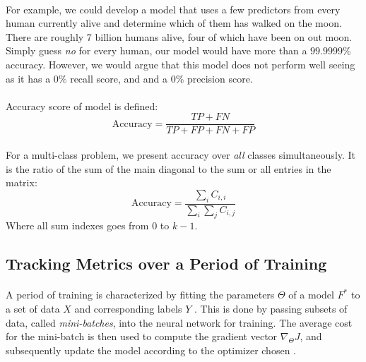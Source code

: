 \documentclass[12pt,letterpaper]{article}
\begin{document}
\paragraph*{}For example, we could develop a model that uses a few predictors from every human currently alive and determine which of them has walked on the moon. There are roughly 7 billion humans alive, four of which have been on out moon. Simply guess \textit{no} for every human, our model would have more than a $99.9999\%$ accuracy. However, we would argue that this model does not perform well seeing as it has a $0 \%$ recall score, and and a $0 \%$ precision score.

\paragraph*{}Accuracy score of model is defined:
\begin{equation}
\label{eqn-BinaryAccuracy}
\text{Accuracy} = \frac{TP + FN}{TP + FP + FN + FP}
\end{equation}

\paragraph*{}For a multi-class problem, we present accuracy over \textit{all} classes simultaneously. It is the ratio of the sum of the main diagonal to the sum or all entries in the matrix:
\begin{equation}
\label{eqn-AvgAccuracy}
\text{Accuracy} = \frac{\sum_{i}C_{i,i}}{\sum_{i}\sum_{j}C_{i,j}}
\end{equation}
Where all sum indexes goes from $0$ to $k-1$.


\subsection{Tracking Metrics over a Period of Training}
\label{subsec-TrainingMetrics}

\paragraph*{}A period of training is characterized by fitting the parameters $\Theta$ of a model $F^*$ to a set of data $X$ and corresponding labels $Y$ \cite{Goodfellow,Virtanen}. This is done by passing subsets of data, called \textit{mini-batches}, into the neural network for training. The average cost for the mini-batch is then used to compute the gradient vector $\nabla_{\Theta}J$, and subsequently update the model according to the optimizer chosen \cite{Geron,Goodfellow}. 
\end{document}
